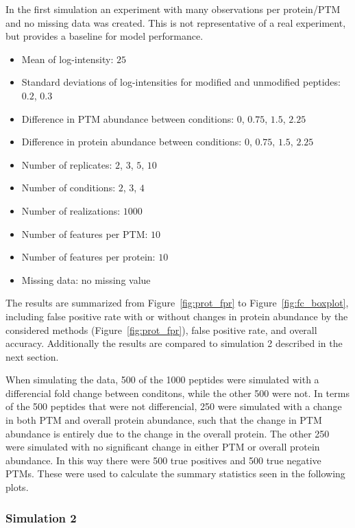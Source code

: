 \documentclass{mcp}
\def\sfigref#1{{Figure~\ref{#1}}}
\begin{document}
In the first simulation an experiment with many observations per protein/PTM and no missing data was created. This is not representative of a real experiment, but provides a baseline for model performance.

\begin{itemize}
\item Mean of log-intensity: $25$
\item Standard deviations of log-intensities for modified and unmodified peptides: $0.2$, $0.3$
\item Difference in PTM abundance between conditions: $0$, $0.75$, $1.5$, $2.25$
\item Difference in protein abundance between conditions: $0$, $0.75$, $1.5$, $2.25$
\item Number of replicates: $2$, $3$, $5$, $10$
\item Number of conditions: $2$, $3$, $4$
\item Number of realizations: $1000$
\item Number of features per PTM: $10$
\item Number of features per protein: $10$
\item Missing data: no missing value
\end{itemize}

The results are summarized from \sfigref{fig:prot_fpr} to \sfigref{fig:fc_boxplot}, including false positive rate with or without changes in protein abundance by the considered methods (\sfigref{fig:prot_fpr}), false positive rate, and overall accuracy. Additionally the results are compared to simulation 2 described in the next section.

When simulating the data, 500 of the 1000 peptides were simulated with a differencial fold change between conditons, while the other 500 were not. In terms of the 500 peptides that were not differencial, 250 were simulated with a change in both PTM and overall protein abundance, such that the change in PTM abundance is entirely due to the change in the overall protein. The other 250 were simulated with no significant change in either PTM or overall protein abundance. In this way there were 500 true positives and 500 true negative PTMs. These were used to calculate the summary statistics seen in the following plots.

\subsubsection{Simulation 2}
\end{document}
